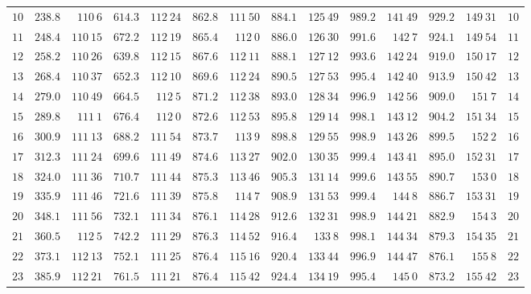 \begin{center}
\begin{tabular}{r|r|r|r|r|r|r|r|r|r|r|r|r|r}
$10$ & $238.8$ & $110\ 6$ & $614.3$ & $112\ 24$ & $862.8$ & $111\ 50$ & $884.1$ & $125\ 49$ & $989.2$ & $141\ 49$ & $929.2$ & $149\ 31$ & $10$ \\[3pt]
$11$ & $248.4$ & $110\ 15$ & $672.2$ & $112\ 19$ & $865.4$ & $112\ 0$ & $886.0$ & $126\ 30$ & $991.6$ & $142\ 7$ & $924.1$ & $149\ 54$ & $11$ \\
$12$ & $258.2$ & $110\ 26$ & $639.8$ & $112\ 15$ & $867.6$ & $112\ 11$ & $888.1$ & $127\ 12$ & $993.6$ & $142\ 24$ & $919.0$ & $150\ 17$ & $12$ \\
$13$ & $268.4$ & $110\ 37$ & $652.3$ & $112\ 10$ & $869.6$ & $112\ 24$ & $890.5$ & $127\ 53$ & $995.4$ & $142\ 40$ & $913.9$ & $150\ 42$ & $13$ \\
$14$ & $279.0$ & $110\ 49$ & $664.5$ & $112\ 5$ & $871.2$ & $112\ 38$ & $893.0$ & $128\ 34$ & $996.9$ & $142\ 56$ & $909.0$ & $151\ 7$ & $14$ \\
$15$ & $289.8$ & $111\ 1$ & $676.4$ & $112\ 0$ & $872.6$ & $112\ 53$ & $895.8$ & $129\ 14$ & $998.1$ & $143\ 12$ & $904.2$ & $151\ 34$ & $15$ \\[3pt]
$16$ & $300.9$ & $111\ 13$ & $688.2$ & $111\ 54$ & $873.7$ & $113\ 9$ & $898.8$ & $129\ 55$ & $998.9$ & $143\ 26$ & $899.5$ & $152\ 2$ & $16$ \\
$17$ & $312.3$ & $111\ 24$ & $699.6$ & $111\ 49$ & $874.6$ & $113\ 27$ & $902.0$ & $130\ 35$ & $999.4$ & $143\ 41$ & $895.0$ & $152\ 31$ & $17$ \\
$18$ & $324.0$ & $111\ 36$ & $710.7$ & $111\ 44$ & $875.3$ & $113\ 46$ & $905.3$ & $131\ 14$ & $999.6$ & $143\ 55$ & $890.7$ & $153\ 0$ & $18$ \\
$19$ & $335.9$ & $111\ 46$ & $721.6$ & $111\ 39$ & $875.8$ & $114\ 7$ & $908.9$ & $131\ 53$ & $999.4$ & $144\ 8$ & $886.7$ & $153\ 31$ & $19$ \\
$20$ & $348.1$ & $111\ 56$ & $732.1$ & $111\ 34$ & $876.1$ & $114\ 28$ & $912.6$ & $132\ 31$ & $998.9$ & $144\ 21$ & $882.9$ & $154\ 3$ & $20$ \\[3pt]
$21$ & $360.5$ & $112\ 5$ & $742.2$ & $111\ 29$ & $876.3$ & $114\ 52$ & $916.4$ & $133\ 8$ & $998.1$ & $144\ 34$ & $879.3$ & $154\ 35$ & $21$ \\
$22$ & $373.1$ & $112\ 13$ & $752.1$ & $111\ 25$ & $876.4$ & $115\ 16$ & $920.4$ & $133\ 44$ & $996.9$ & $144\ 47$ & $876.1$ & $155\ 8$ & $22$ \\
$23$ & $385.9$ & $112\ 21$ & $761.5$ & $111\ 21$ & $876.4$ & $115\ 42$ & $924.4$ & $134\ 19$ & $995.4$ & $145\ 0$ & $873.2$ & $155\ 42$ & $23$ \\

\end{tabular}
\end{center}

